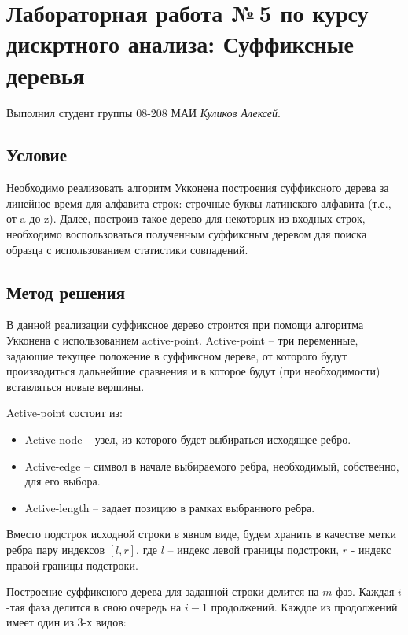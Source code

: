 \documentclass[12pt]{article}
\begin{document}
\section*{Лабораторная работа №\,5 по курсу дискртного анализа: Суффиксные деревья
}

Выполнил студент группы 08-208 МАИ \textit{Куликов Алексей}.

\subsection*{Условие}

Необходимо реализовать алгоритм Укконена построения суффиксного дерева за линейное время для алфавита строк: строчные буквы латинского алфавита (т.е., от a до z). 
Далее, построив такое дерево для некоторых из входных строк, необходимо воспользоваться полученным суффиксным деревом для поиска образца с использованием статистики совпадений.

\subsection*{Метод решения}

В данной реализации суффиксное дерево строится при помощи алгоритма Укконена с использованием active-point. Active-point -- три переменные, задающие текущее положение в суффиксном дереве, от которого будут производиться дальнейшие сравнения и в которое будут (при необходимости) вставляться новые вершины.

Active-point состоит из:
\begin{itemize}
    \item Active-node -- узел, из которого будет выбираться исходящее ребро.
    \item Active-edge -- символ в начале выбираемого ребра, необходимый, собственно, для его выбора.
     \item Active-length -- задает позицию в рамках выбранного ребра.
\end{itemize}

Вместо подстрок исходной строки в явном виде, будем хранить в качестве метки ребра пару индексов $[l, r]$, где $l$ -- индекс левой границы подстроки, $r$ - индекс правой границы подстроки.

Построение суффиксного дерева для заданной строки делится на $m$ фаз. Каждая $i$-тая фаза делится в свою очередь на $i-1$ продолжений. Каждое из продолжений имеет один из 3-х видов:
\end{document}
